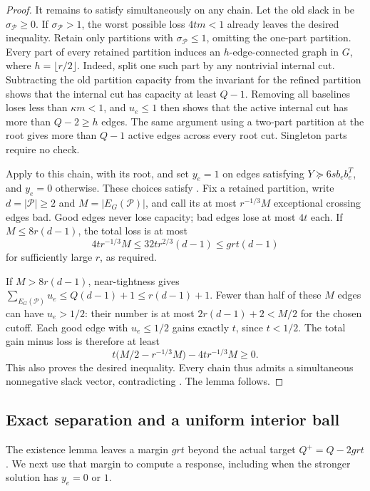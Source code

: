 \begin{proof}
It remains to satisfy  simultaneously on any
chain. Let the old slack in  be
$\sigma_{\mathcal P}\ge0$. If $\sigma_{\mathcal P}>1$, the worst possible
loss $4tm<1$ already leaves the desired inequality. Retain only partitions
with $\sigma_{\mathcal P}\le1$, omitting the one-part partition. Every
part of every retained partition induces an
$h$-edge-connected graph in $G$, where $h=\lfloor r/2\rfloor$.
Indeed, split one such part by any nontrivial internal cut. Subtracting
the old partition capacity from the invariant for the refined partition
shows that the internal cut has capacity at least $Q-1$. Removing all
baselines loses less than $\kappa m<1$, and $u_e\le1$ then shows that
the active internal cut has more than $Q-2\ge h$ edges. The same argument
using a two-part partition at the root gives more than $Q-1$ active
edges across every root cut. Singleton parts require no check.

Apply  to this chain, with its root, and set $y_e=1$
on edges satisfying $Y\succeq6s b_eb_e^T$, and $y_e=0$ otherwise.
These choices satisfy . Fix a retained partition,
write $d=|\mathcal P|\ge2$ and $M=|E_G(\mathcal P)|$, and call its at most
$r^{-1/3}M$ exceptional crossing edges bad. Good edges never lose
capacity; bad edges lose at most $4t$ each. If $M\le8r(d-1)$, the total
loss is at most
\[
 4t r^{-1/3}M\le32tr^{2/3}(d-1)\le grt(d-1)
\]
for sufficiently large $r$, as required.

If $M>8r(d-1)$, near-tightness gives
$\sum_{E_G(\mathcal P)}u_e\le Q(d-1)+1\le r(d-1)+1$.
Fewer than half of these $M$ edges can have $u_e>1/2$: their number is
at most $2r(d-1)+2<M/2$ for the chosen cutoff. Each good edge with
$u_e\le1/2$ gains exactly $t$, since $t<1/2$. The total gain minus loss
is therefore at least
\[
 t\bigl(M/2-r^{-1/3}M\bigr)-4tr^{-1/3}M\ge0.
\]
This also proves the desired inequality. Every chain thus admits a
simultaneous nonnegative slack vector, contradicting
. The lemma follows.
\end{proof}

\subsection{Exact separation and a uniform interior ball}

The existence lemma leaves a margin $grt$ beyond the actual target
$Q^+=Q-2grt$. We next use that margin to compute a response, including
when the stronger solution has $y_e=0$ or $1$.

